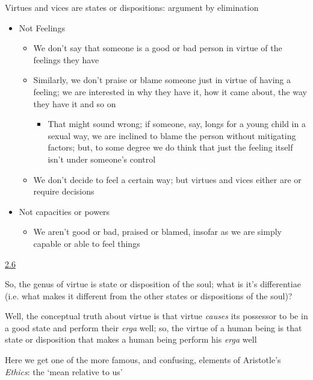 \documentclass[11pt]{article}
\begin{document}
\noindent Virtues and vices are states or dispositions: argument by elimination

\begin{itemize}\item{Not Feelings}\begin{itemize}\item{We don't say that someone is a good or bad person in virtue of the feelings they have}\item{Similarly, we don't praise or blame someone just in virtue of having a feeling; we are interested in why they have it, how it came about, the way they have it and so on}\begin{itemize}\item{That might sound wrong; if someone, say, longs for a young child in a sexual way, we are inclined to blame the person without mitigating factors; but, to some degree we do think that just the feeling itself isn't under someone's control}\end{itemize}\item{We don't decide to feel a certain way; but virtues and vices either are or require decisions}\end{itemize}\item{Not capacities or powers}\begin{itemize}\item{We aren't good or bad, praised or blamed, insofar as we are simply capable or able to feel things}\end{itemize}\end{itemize}

\noindent\underline{2.6}
\vspace*{2mm}

\noindent So, the genus of virtue is state or disposition of the soul; what is it's differentiae (i.e. what makes it different from the other states or dispositions of the soul)?
\vspace*{2mm}

\noindent Well, the conceptual truth about virtue is that virtue \emph{causes} its possessor to be in a good state and perform their \emph{erga} well; so, the virtue of a human being is that state or disposition that makes a human being perform his \emph{erga} well
\vspace*{2mm}

\noindent Here we get one of the more famous, and confusing, elements of Aristotle's \emph{Ethics}: the `mean relative to us'
\vspace*{2mm}
\end{document}
